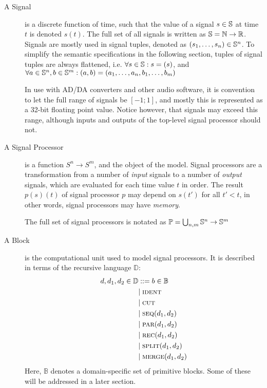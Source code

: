 \begin{description}
  \item[A Signal] is a discrete function of time, such that the value of a signal $s \in \mathbb{S}$ at time
        $t$ is denoted $s(t)$. The full set of all signals is written as
        $\mathbb{S} = \mathbb N \rightarrow \mathbb R$. Signals are mostly used in signal tuples, denoted as $(s_1, \dots, s_n) \in \mathbb{S}^n$. To
        simplify the semantic specifications in the following section, tuples of signal tuples are always flattened,
        i.e. $\forall s \in \mathbb{S}: s = (s)$, and $\forall a \in \mathbb{S}^n, b \in \mathbb{S}^m : (a, b) = (a_1, \dots, a_n, b_1, \dots, b_m)$

        In use with AD/DA converters and other audio software, it is convention to let the full range of signals be
        $[-1; 1]$, and mostly this is represented as a 32-bit floating point value. Notice however, that
        signals may exceed this range, although inputs and outputs of the top-level signal processor should not.

  \item[A Signal Processor] is a function $S^n \rightarrow S^m$, and the object of the model. Signal processors are
        a transformation from a number of \emph{input} signals to a number of \emph{output}
        signals, which are evaluated for each time value $t$ in order. The result
        $p(s)(t)$ of signal processor $p$ may depend on $s(t')$ for
        all $t' < t$, in other words, signal processors may have \emph{memory}.

        The full set of signal processors is notated as $\mathbb P = \bigcup_{n,m} \mathbb{S}^n \rightarrow \mathbb{S}^m$

  \item[A Block] is the computational unit used to model signal processors. It is described in terms of the
        recursive language $\mathbb D$:
        \begin{align*}
          d, d_1, d_2 \in \mathbb{D} & ::= b \in \mathbb{B}      \\
                                     & |\; \textsc{ident}                \\
                                     & |\; \textsc{cut}                  \\
                                     & |\; \textsc{seq}(d_1, d_2) \\
                                     & |\; \textsc{par}(d_1, d_2)   \\
                                     & |\; \textsc{rec}(d_1, d_2)  \\
                                     & |\; \textsc{split}(d_1, d_2)      \\
                                     & |\; \textsc{merge}(d_1, d_2)      \\
        \end{align*}
        Here, $\mathbb B$ denotes a domain-specific set of primitive blocks. Some of these will be
        addressed in a later section.


\end{description}
